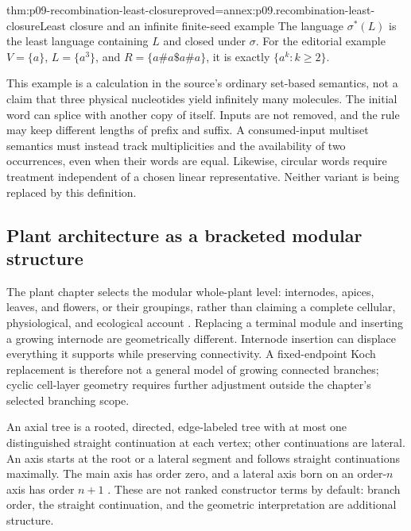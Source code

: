 \begin{hbtheorem}{thm:p09-recombination-least-closure}{proved=annex:p09.recombination-least-closure}{Least closure and an infinite finite-seed example}
The language \(\sigma^*(L)\) is the least language containing \(L\) and
closed under \(\sigma\). For the editorial example
\(V=\{a\}\), \(L=\{a^3\}\), and \(R=\{a\#a\$a\#a\}\), it is exactly
\(\{a^k:k\geq2\}\).
\end{hbtheorem}

This example is a calculation in the source's ordinary set-based semantics,
not a claim that three physical nucleotides yield infinitely many molecules.
The initial word can splice with another copy of itself. Inputs are not
removed, and the rule may keep different lengths of prefix and suffix.
A consumed-input multiset semantics must instead track multiplicities and
the availability of two occurrences, even when their words are equal.
Likewise, circular words require treatment independent of a chosen linear
representative. Neither variant is being replaced by this definition.

\subsection{Plant architecture as a bracketed modular structure}
\label{sec:p09-development-architecture}

The plant chapter selects the modular whole-plant level: internodes, apices,
leaves, and flowers, or their groupings, rather than claiming a complete
cellular, physiological, and ecological account
\cite[pp.~536--540]{PrusinkiewiczEtAl1997DevelopmentIntake}.
Replacing a terminal module and inserting a growing internode are geometrically
different. Internode insertion can displace everything it supports while
preserving connectivity. A fixed-endpoint Koch replacement is therefore not
a general model of growing connected branches; cyclic cell-layer geometry
requires further adjustment outside the chapter's selected branching scope.

An axial tree is a rooted, directed, edge-labeled tree with at most one
distinguished straight continuation at each vertex; other continuations are
lateral. An axis starts at the root or a lateral segment and follows straight
continuations maximally. The main axis has order zero, and a lateral axis
born on an order-\(n\) axis has order \(n+1\)
\cite[pp.~540--541]{PrusinkiewiczEtAl1997DevelopmentIntake}.
These are not ranked constructor terms by default: branch order, the straight
continuation, and the geometric interpretation are additional structure.

